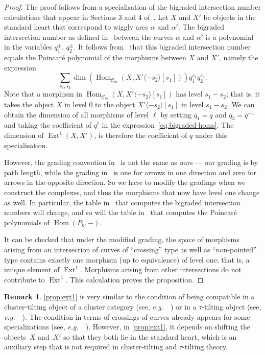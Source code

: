 \documentclass{amsart}
\theoremstyle{definition}
\newtheorem{remark}[theorem]{Remark}
\DeclareMathOperator{\Hom}{Hom} %
\DeclareMathOperator{\Ext}{Ext} %
\newcommand{\eg}{\textit{e.g.}~} %
\begin{document}
\begin{proof}
  The proof follows from a specialisation of the bigraded intersection number calculations that appear in Sections 3 and 4 of~\cite{kho.sei:02}.
  Let \(X\) and \(X'\) be objects in the standard heart that correspond to wiggly arcs \(\alpha\) and \(\alpha'\).
  The bigraded intersection number as defined in~\cite[Sect.~3d]{kho.sei:02} between the curves \(\alpha\) and \(\alpha'\) is a polynomial in the variables \(q_1^{\pm}\), \(q_2^{\pm}\).
  It follows from~\cite[Prop.~4.9]{kho.sei:02} that this bigraded intersection number equals the Poincar{\'e} polynomial of the morphisms between \(X\) and \(X'\), namely the expression
  \begin{equation}
    \label{eq:bigraded-homs}
  \sum_{s_1,s_2}\dim(\Hom_{\mathcal{C}_m}(X,X'\langle -s_2 \rangle[s_1]))q_1^{s_1}q_2^{s_2}.    
\end{equation}
  Note that a morphism in \(\Hom_{\mathcal{C}_m}(X,X'\langle -s_2 \rangle[s_1])\) has level \(s_1 - s_2\); that is, it takes the object \(X\) in level \(0\) to the object \(X'\langle -s_2 \rangle[s_1]\) in level \(s_1 - s_2\).
  We can obtain the dimension of all morphisms of level \(\ell\) by setting \(q_1 = q\) and \(q_2 = q^{-1}\) and taking the coefficient of \(q^{\ell}\) in the expression~\ref{eq:bigraded-homs}.
    The dimension of \(\Ext^1(X,X')\), is therefore the coefficient of \(q\) under this specialisation.

However, the grading convention in~\cite{kho.sei:02} is not the same as ours --- our grading is by path length, while the grading in~\cite{kho.sei:02} is one for arrows in one direction and zero for arrows in the opposite direction.
So we have to modify the gradings when we construct the complexes, and thus the morphisms that now have level one change as well.
In particular, the table in~\cite[Lemma 3.20]{kho.sei:02} that computes the bigraded intersection numbers will change, and so will the table in~\cite[Lemma 4.12]{kho.sei:02} that computes the Poincar{\'e} polynomials of \(\Hom(P_k,-)\).

It can be checked that under the modified grading, the space of morphisms arising from an intersection of curves of ``crossing'' type as well as ``non-pointed'' type contains exactly one morphism (up to equivalence) of level one; that is, a unique element of \(\Ext^1\).
Morphisms arising from other intersections do not contribute to \(\Ext^1\).
This calculation proves the proposition.
\end{proof}
\begin{remark}
  \cref{prop:ext1} is very similar to the condition of being compatible in a cluster-tilting object of a cluster category (see, \eg~\cite[Cor.~4.3]{bua.mar.rei.ea:06}) or in a $\tau$-tilting object (see, \eg~\cite{AdachiIyamaReiten}).
  The condition in terms of crossings of curves already appears for some specializations (see, \eg~\cite{FominShapiroThurston, PaluPilaudPlamondon-surfaces}).
  However, in \cref{prop:ext1}, it depends on shifting the objects~\(X\) and~\(X'\) so that they both lie in the standard heart, which is an auxiliary step that is not required in cluster-tilting and $\tau$-tilting theory.
\end{remark}
\end{document}
